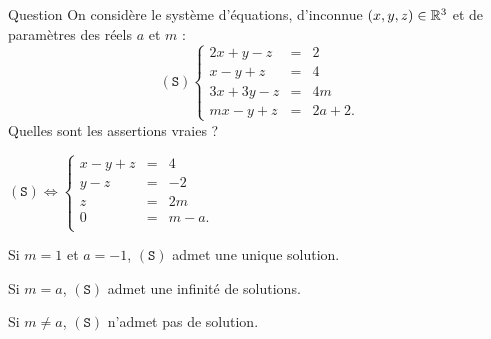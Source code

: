 \begin{multi}[multiple,feedback=
{\[(\mathtt{S}) \Leftrightarrow 
\left\{\begin{array}{rcc}
x-y+z&=&4\\
y-z&=&-2\\ 
3y-2z&=&2m-6 \\
(m-1)y+(1-m)z&=&2a-4m+2 \\
\end{array}\right. \Leftrightarrow 
\left\{\begin{array}{rcc}
x-y+z&=&4\\
y-z&=&-2\\ 
z&=&2m \\
0&=&m-a. \\
\end{array}\right.\]
Si \(m=a\), \((\mathtt{S})\) admet une unique solution et si \(m\neq a\), \((\mathtt{S})\) n'admet pas de solution.
}]{Question}
On considère le système d'équations, d'inconnue \((x,y,z)\in \mathbb{R}^3\) et de paramètres des réels \(a\) et \(m\) : 
\[(\mathtt{S})  
\left\{\begin{array}{rcc}
2x+y-z&=&2\\
x-y+z&=&4\\ 
3x+3y-z&=&4m \\
mx-y+z&=&2a+2. \end{array}\right.\]
Quelles sont les assertions vraies ?

    \item* \((\mathtt{S})\Leftrightarrow
\left\{\begin{array}{rcc}
x-y+z&=&4\\
y-z&=&-2\\
z&=&2m \\
0&=&m-a. \\
\end{array}\right.\)
    \item Si \(m=1\) et \(a=-1\), \((\mathtt{S})\) admet une unique solution.
    \item Si \(m =a\), \((\mathtt{S})\) admet une infinité de solutions.
    \item* Si \(m\neq a\), \((\mathtt{S})\) n'admet pas de solution.
\end{multi}


